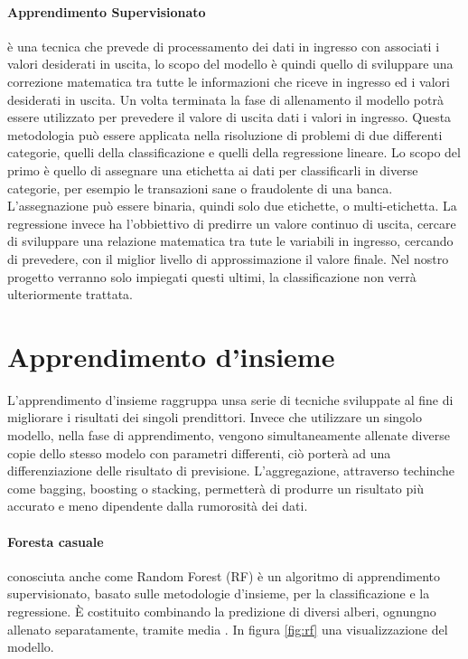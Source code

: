 \documentclass[%
    corpo=12pt,
    twoside,
    oldstyle,
    autoretitolo,
    greek,
    evenboxes,
]{toptesi}
\begin{document}
\paragraph{Apprendimento Supervisionato}
è una tecnica che prevede di processamento dei dati in ingresso con associati i valori desiderati in uscita, lo scopo del modello è quindi quello di sviluppare una correzione matematica tra tutte le informazioni che riceve in ingresso ed i valori desiderati in uscita. Un volta terminata la fase di allenamento il modello potrà essere utilizzato per prevedere il valore di uscita dati i valori in ingresso. Questa metodologia può essere applicata nella risoluzione di problemi di due differenti categorie, quelli della classificazione e quelli della regressione lineare. Lo scopo del primo è quello di assegnare una etichetta ai dati per classificarli in diverse categorie, per esempio le transazioni sane o fraudolente di una banca. L'assegnazione può essere binaria, quindi solo due etichette, o multi-etichetta. La regressione invece ha l'obbiettivo di predirre un valore continuo di uscita, cercare di sviluppare una relazione matematica tra tute le variabili in ingresso, cercando di prevedere, con il miglior livello di approssimazione il valore finale. Nel nostro progetto verranno solo impiegati questi ultimi, la classificazione non verrà ulteriormente trattata.

\section{Apprendimento d'insieme}
L'apprendimento d'insieme raggruppa unsa serie di tecniche sviluppate al fine di migliorare i risultati dei singoli prendittori. Invece che utilizzare un singolo modello, nella fase di apprendimento, vengono simultaneamente allenate diverse copie dello stesso modelo con parametri differenti, ciò porterà ad una differenziazione delle risultato di previsione. L'aggregazione, attraverso techinche come bagging, boosting o stacking, permetterà di produrre un risultato più accurato e meno dipendente dalla rumorosità dei dati.

\paragraph{Foresta casuale}
conosciuta anche come Random Forest (RF) è un algoritmo di apprendimento supervisionato, basato sulle metodologie d'insieme, per la classificazione e la regressione. È costituito combinando la predizione di diversi alberi, ognungno allenato separatamente, tramite media \cite{RF_theory}. In figura \ref{fig:rf} una visualizzazione del modello.
\end{document}
